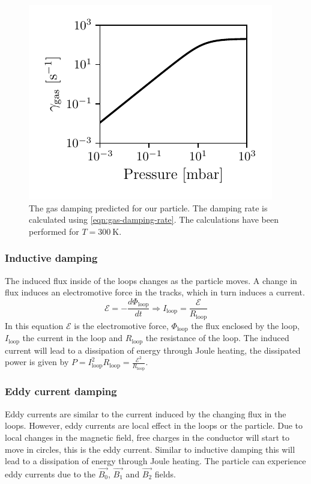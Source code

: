 \begin{figure}
    \centering
    \includegraphics{figures/data/gas_damping.pdf}
    \caption{The gas damping predicted for our particle. The damping rate is calculated using \autoref{eqn:gas-damping-rate}. The calculations have been performed for $T=\qty{300}{\kelvin}$.}
    \label{fig:gas-damping}
\end{figure}

\subsubsection{Inductive damping}
\label{subsubsec:inductive-damping}
The induced flux inside of the loops changes as the particle moves. A change in flux induces an electromotive force in the tracks, which in turn induces a current.
\begin{equation}
    \mathcal{E} = -\frac{d\Phi_\text{loop}}{dt} \Rightarrow I_\text{loop} = \frac{\mathcal{E}}{R_\text{loop}}
\end{equation}
In this equation $\mathcal{E}$ is the electromotive force, $\Phi_\text{loop}$ the flux enclosed by the loop, $I_\text{loop}$ the current in the loop and $R_\text{loop}$ the resistance of the loop. The induced current will lead to a dissipation of energy through Joule heating, the dissipated power is given by $P = I_\text{loop}^2 R_\text{loop} = \frac{\mathcal{E}^2}{R_\text{loop}}$.

\subsubsection{Eddy current damping}
\label{subsubsec:eddy-current-damping}
Eddy currents are similar to the current induced by the changing flux in the loops. However, eddy currents are local effect in the loops or the particle. Due to local changes in the magnetic field, free charges in the conductor will start to move in circles, this is the eddy current. Similar to inductive damping this will lead to a dissipation of energy through Joule heating. The particle can experience eddy currents due to the $\vec{B_0}$, $\vec{B_1}$ and $\vec{B_2}$ fields.

